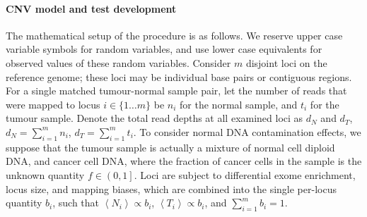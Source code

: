 \documentclass[thesis.tex]{subfiles}
\begin{document}
\paragraph{\Acrshort{CNV} model and test development}

The mathematical setup of the procedure is as follows.  We reserve upper case variable symbols for random variables, and use lower case equivalents for observed values of these random variables.  Consider $m$ disjoint loci on the reference genome; these loci may be individual base pairs or contiguous regions.  For a single matched tumour-normal sample pair, let the number of reads that were mapped to locus $i \in \{1 \dots m\}$ be $n_i$ for the normal sample, and $t_i$ for the tumour sample.  Denote the total read depths at all examined loci as $d_N$ and $d_T$, $d_N = \sum_{i=1}^{m} n_i$, $d_T = \sum_{i=1}^{m} t_i$. To consider normal DNA contamination effects, we suppose that the tumour sample is actually a mixture of normal cell diploid DNA, and cancer cell DNA, where the fraction of cancer cells in the sample is the unknown quantity $f \in \left(0, 1\right]$.  Loci are subject to differential exome enrichment, locus size, and mapping biases, which are combined into the single per-locus quantity $b_i$, such that $\left<N_i\right> \propto b_i$, $\left<T_i\right> \propto b_i$, and $\sum_{i=1}^{m} b_i = 1$.
\end{document}
